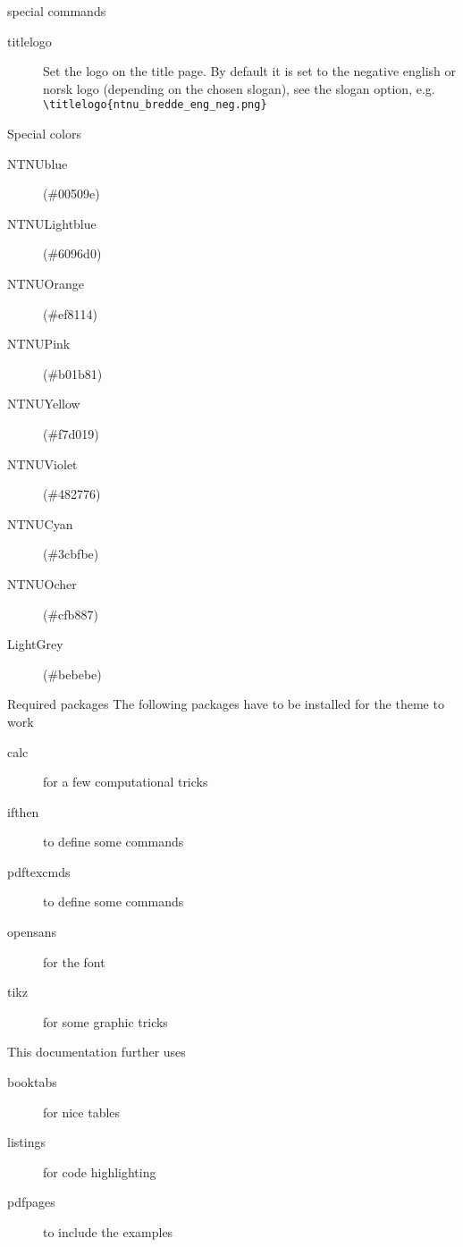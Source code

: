 \documentclass[aspectratio=169]{beamer}
\begin{document}
		\begin{frame}[fragile]{special commands}
			\begin{description}
				\item[titlelogo]
				Set the logo on the title page. By default it is set to the negative english or norsk logo (depending on the chosen slogan), see the slogan option, e.g.\,
				\lstinline!\titlelogo{ntnu_bredde_eng_neg.png}!
			\end{description}
		\end{frame}
		\begin{frame}{Special colors}
			\begin{description}
				\item[{\color{NTNUBlue} NTNUblue}] (\#{\color{NTNUBlue}00509e})
				\item[{\color{NTNULightblue} NTNULightblue}] (\#{\color{NTNULightblue}6096d0})
				\item[{\color{NTNUOrange} NTNUOrange}] (\#{\color{NTNUOrange}ef8114})
				\item[{\color{NTNUPink} NTNUPink}] (\#{\color{NTNUPink}b01b81})
				\item[{\color{NTNUYellow} NTNUYellow}] (\#{\color{NTNUYellow}f7d019})
				\item[{\color{NTNUViolet} NTNUViolet}] (\#{\color{NTNUViolet}482776})
				\item[{\color{NTNUCyan} NTNUCyan}] (\#{\color{NTNUCyan}3cbfbe})
				\item[{\color{NTNUOcher} NTNUOcher}] (\#{\color{NTNUOcher}cfb887})
				\item[{\color{LightGrey} LightGrey}] (\#{\color{LightGrey}bebebe})
			\end{description}
		\end{frame}
		\begin{frame}{Required packages}
			The following packages have to be installed for the theme to work
			\begin{description}
				\item[calc] for a few computational tricks
				\item[ifthen] to define some commands
				\item[pdftexcmds] to define some commands
				\item[opensans] for the font
				\item[tikz] for some graphic tricks
			\end{description}
			This documentation further uses
			\begin{description}
				\item[booktabs] for nice tables
				\item[listings] for code highlighting
				\item[pdfpages] to include the examples
			\end{description}
		\end{frame}
\end{document}

